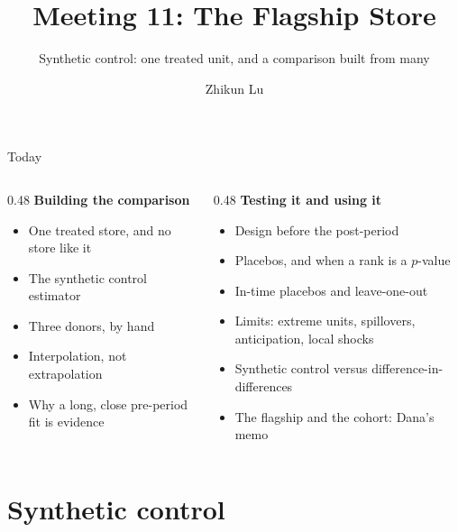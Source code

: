 \documentclass[aspectratio=169, 11pt, handout]{beamer}
\title[Meeting 11]{Meeting 11: The Flagship Store}
\subtitle{Synthetic control: one treated unit, and a comparison built from many}
\author{Zhikun Lu}
\date{}
\begin{document}
\begin{frame}
\titlepage
\end{frame}

\begin{frame}{Today}

\begin{columns}[T]
\begin{column}{0.48\textwidth}
\textbf{Building the comparison}
\begin{itemize}
  \item One treated store, and no store like it
  \item The synthetic control estimator
  \item Three donors, by hand
  \item Interpolation, not extrapolation
  \item Why a long, close pre-period fit is evidence
\end{itemize}
\end{column}
\begin{column}{0.48\textwidth}
\textbf{Testing it and using it}
\begin{itemize}
  \item Design before the post-period
  \item Placebos, and when a rank is a $p$-value
  \item In-time placebos and leave-one-out
  \item Limits: extreme units, spillovers, anticipation, local shocks
  \item Synthetic control versus difference-in-differences
  \item The flagship and the cohort: Dana's memo
\end{itemize}
\end{column}
\end{columns}
\end{frame}

\section{Synthetic control}
\end{document}
